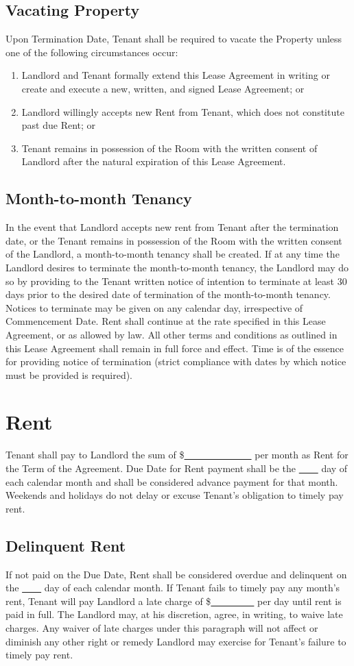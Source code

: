 \documentclass{amsart}
\begin{document}
\subsection{Vacating Property}
Upon Termination Date, Tenant shall be required to vacate the Property unless
one of the following circumstances occur:
\begin{enumerate}
    \item Landlord and Tenant formally extend this Lease Agreement in writing or
        create and execute a new, written, and signed  Lease Agreement; or
    \item Landlord willingly accepts new Rent from Tenant, which does not
        constitute past due Rent; or
    \item Tenant remains in possession of the Room with the written consent of
        Landlord after the natural expiration of this Lease Agreement.
\end{enumerate}
\subsection{Month-to-month Tenancy}
In the event that Landlord accepts new rent from Tenant after the termination
date, or the Tenant remains in possession of the Room with the written consent
of the Landlord, a month-to-month tenancy shall be created. If at any time the
Landlord desires to terminate the month-to-month tenancy, the Landlord may do so
by providing to the Tenant written notice of intention to terminate at least
30 days prior to the desired date of termination of the month-to-month tenancy.
Notices to terminate may be given on any calendar day, irrespective of
Commencement Date. Rent shall continue at the rate specified in this Lease
Agreement, or as allowed by law. All other terms and conditions as outlined in
this Lease Agreement shall remain in full force and effect. Time is of the
essence for providing notice of termination (strict compliance with dates by
which notice must be provided is required).
\section{Rent}
Tenant shall pay to Landlord the sum of
\$\underline{\ \ \ \ \ \ \ \ \ \ \ \ \ \ } per month as Rent for the Term of the
Agreement. Due Date for Rent payment shall be the \underline{\ \ \ \ } day of
each calendar month and shall be considered advance payment for that month.
Weekends and holidays do not delay or excuse Tenant's obligation to timely pay
rent.
\subsection{Delinquent Rent}
If not paid on the Due Date, Rent shall be considered overdue and delinquent on
the \underline{\ \ \ \ } day of each calendar month. If Tenant fails to timely
pay any month's rent, Tenant will pay Landlord a late charge of
\$\underline{\ \ \ \ \ \ \ \ \ } per day until rent is paid in full. The
Landlord may, at his discretion, agree, in writing, to waive late charges. Any
waiver of late charges under this paragraph will not affect or diminish any
other right or remedy Landlord may exercise for Tenant's failure to timely pay
rent.
\end{document}
